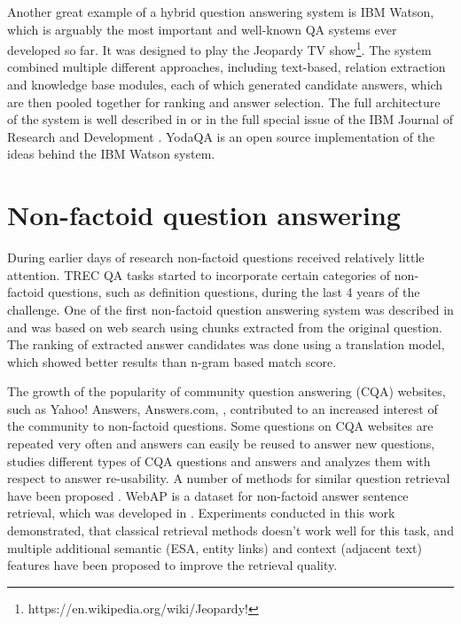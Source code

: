 Another great example of a hybrid question answering system is IBM Watson, which is arguably the most important and well-known QA systems ever developed so far.
It was designed to play the Jeopardy TV show\footnote{https://en.wikipedia.org/wiki/Jeopardy!}.
The system combined multiple different approaches, including text-based, relation extraction and knowledge base modules, each of which generated candidate answers, which are then pooled together for ranking and answer selection.
The full architecture of the system is well described in \cite{ferrucci2010building} or in the full special issue of the IBM Journal of Research and Development \cite{ibm_watson_special_issue}.
YodaQA \cite{baudivs2015yodaqa} is an open source implementation of the ideas behind the IBM Watson system.



\section{Non-factoid question answering}
\label{sec:rel_work:nonfactoid}

During earlier days of research non-factoid questions received relatively little attention.
TREC QA tasks started to incorporate certain categories of non-factoid questions, such as definition questions, during the last 4 years of the challenge.
One of the first non-factoid question answering system was described in \cite{soricut2006automatic} and was based on web search using chunks extracted from the original question.
The ranking of extracted answer candidates was done using a translation model, which showed better results than n-gram based match score.

The growth of the popularity of community question answering (CQA) websites, such as Yahoo! Answers, Answers.com, \etc, contributed to an increased interest of the community to non-factoid questions.
Some questions on CQA websites are repeated very often and answers can easily be reused to answer new questions, \cite{Liu:2008:USA:1599081.1599144} studies different types of CQA questions and answers and analyzes them with respect to answer re-usability.
A number of methods for similar question retrieval have been proposed \cite{bernhard2009combining,Shtok:2012:LPA:2187836.2187939,duan2008searching,Jeon:2005:FSQ:1099554.1099572}.
WebAP is a dataset for non-factoid answer sentence retrieval, which was developed in \cite{yang2016beyond}.
Experiments conducted in this work demonstrated, that classical retrieval methods doesn't work well for this task, and multiple additional semantic (ESA, entity links) and context (adjacent text) features have been proposed to improve the retrieval quality.

